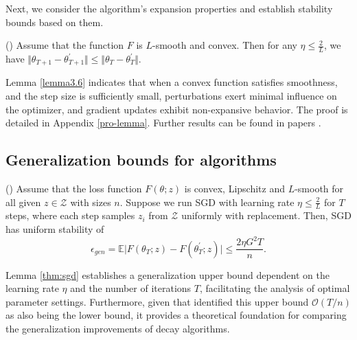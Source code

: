 Next, we consider the algorithm's expansion properties and establish stability bounds based on them.

\begin{lemma}{\rm (\citet[Lemma 3.6]{hardt2016train})}
\label{lemma3.6}
Assume that the function $F$ is $L$-smooth and convex. Then for any $\eta \leq \frac{2}{L}$, we have $\Vert \theta_{T+1}-\theta_{T+1}^{\prime} \Vert \leq \Vert \theta_{T}-\theta_{T}^{\prime}\Vert.$
\end{lemma}

\begin{remark}
Lemma \ref{lemma3.6} indicates that when a convex function satisfies smoothness, and the step size is sufficiently small, perturbations exert minimal influence on the optimizer, and gradient updates exhibit non-expansive behavior. The proof is detailed in Appendix \ref{pro-lemma}. Further results can be found in papers \citep{hardt2016train,xiao2022stability}.    
\end{remark}


\subsection{Generalization bounds for algorithms}

\begin{lemma}{\rm (\citet[Theorem 3.8]{hardt2016train})}\label{thm:sgd}
Assume that the loss function $F(\theta;z)$ is convex, Lipschitz and $L$-smooth for all given $z\in\mathcal{Z}$ with sizes $n$. Suppose we run SGD with learning rate $\eta \leq \frac{2}{L}$ for $T$ steps, where each step samples $z_i$ from $\mathcal{Z}$ uniformly with replacement. Then, SGD has uniform stability of
\begin{equation}
  \epsilon_{gen} = \mathbb{E}\vert F(\theta_T;z)-F(\theta^{\prime}_T;z)\vert \leq \frac{2\eta G^2 T}{n}.
 \end{equation}
\end{lemma}

\begin{remark}
Lemma \ref{thm:sgd} establishes a generalization upper bound dependent on the learning rate $\eta$ and the number of iterations $T$, facilitating the analysis of optimal parameter settings. Furthermore, given that \citet{pmlr-v180-zhang22b} identified this upper bound $\mathcal{O}(T/n)$ as also being the lower bound, it provides a theoretical foundation for comparing the generalization improvements of decay algorithms.    
\end{remark}

